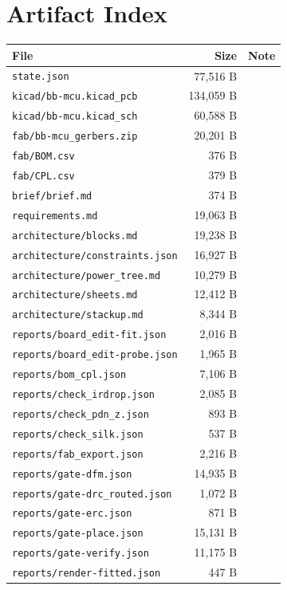 \documentclass[11pt,a4paper]{article}
\begin{document}
\section{Artifact Index}
{\small
\begin{longtable}{p{9cm}rp{4cm}}
\toprule
\textbf{File} & \textbf{Size} & \textbf{Note} \\
\midrule
\endhead
\texttt{state.json} & 77,516 B &  \\
\texttt{kicad/bb-mcu.kicad\_pcb} & 134,059 B &  \\
\texttt{kicad/bb-mcu.kicad\_sch} & 60,588 B &  \\
\texttt{fab/bb-mcu\_gerbers.zip} & 20,201 B &  \\
\texttt{fab/BOM.csv} & 376 B &  \\
\texttt{fab/CPL.csv} & 379 B &  \\
\texttt{brief/brief.md} & 374 B &  \\
\texttt{requirements.md} & 19,063 B &  \\
\texttt{architecture/blocks.md} & 19,238 B &  \\
\texttt{architecture/constraints.json} & 16,927 B &  \\
\texttt{architecture/power\_tree.md} & 10,279 B &  \\
\texttt{architecture/sheets.md} & 12,412 B &  \\
\texttt{architecture/stackup.md} & 8,344 B &  \\
\texttt{reports/board\_edit-fit.json} & 2,016 B &  \\
\texttt{reports/board\_edit-probe.json} & 1,965 B &  \\
\texttt{reports/bom\_cpl.json} & 7,106 B &  \\
\texttt{reports/check\_irdrop.json} & 2,085 B &  \\
\texttt{reports/check\_pdn\_z.json} & 893 B &  \\
\texttt{reports/check\_silk.json} & 537 B &  \\
\texttt{reports/fab\_export.json} & 2,216 B &  \\
\texttt{reports/gate-dfm.json} & 14,935 B &  \\
\texttt{reports/gate-drc\_routed.json} & 1,072 B &  \\
\texttt{reports/gate-erc.json} & 871 B &  \\
\texttt{reports/gate-place.json} & 15,131 B &  \\
\texttt{reports/gate-verify.json} & 11,175 B &  \\
\texttt{reports/render-fitted.json} & 447 B &  \\

\end{longtable}}
\end{document}
